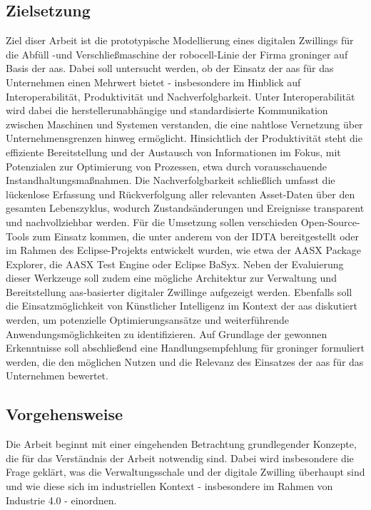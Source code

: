 \subsection{Zielsetzung}
Ziel diser Arbeit ist die prototypische Modellierung eines digitalen Zwillings für die Abfüll -und Verschließmaschine der robocell-Linie der Firma groninger auf Basis der \acs{aas}.
Dabei soll untersucht werden, ob der Einsatz der \acs{aas} für das Unternehmen einen Mehrwert bietet - insbesondere im Hinblick auf Interoperabilität, Produktivität und Nachverfolgbarkeit.
Unter Interoperabilität wird dabei die herstellerunabhängige und standardisierte Kommunikation zwischen Maschinen und Systemen verstanden, die eine nahtlose Vernetzung über Unternehmensgrenzen hinweg ermöglicht.
Hinsichtlich der Produktivität steht die effiziente Bereitstellung und der Austausch von Informationen im Fokus, mit Potenzialen zur Optimierung von Prozessen, etwa durch vorausschauende Instandhaltungsmaßnahmen. 
Die Nachverfolgbarkeit schließlich umfasst die lückenlose Erfassung und Rückverfolgung aller relevanten Asset-Daten über den gesamten Lebenszyklus, wodurch Zustandsänderungen und Ereignisse transparent und nachvollziehbar werden.
Für die Umsetzung sollen verschieden Open-Source-Tools zum Einsatz kommen, die unter anderem von der IDTA bereitgestellt oder im Rahmen des Eclipse-Projekts entwickelt wurden, wie etwa der AASX Package Explorer, die AASX Test Engine oder Eclipse BaSyx.
Neben der Evaluierung dieser Werkzeuge soll zudem eine mögliche Architektur zur Verwaltung und Bereitstellung \acs{aas}-basierter digitaler Zwillinge aufgezeigt werden.
Ebenfalls soll die Einsatzmöglichkeit von Künstlicher Intelligenz im Kontext der \acs{aas} diskutiert werden, um potenzielle Optimierungsansätze und weiterführende Anwendungsmöglichkeiten zu identifizieren.
Auf Grundlage der gewonnen Erkenntnisse soll abschließend eine Handlungsempfehlung für groninger formuliert werden, die den möglichen Nutzen und die Relevanz des Einsatzes der \acs{aas} für das Unternehmen bewertet.
\subsection{Vorgehensweise}
Die Arbeit beginnt mit einer eingehenden Betrachtung grundlegender Konzepte, die für das Verständnis der Arbeit notwendig sind. 
Dabei wird insbesondere die Frage geklärt, was die Verwaltungsschale und der digitale Zwilling überhaupt sind und wie diese sich im industriellen Kontext - insbesondere im Rahmen von Industrie 4.0 - einordnen.

